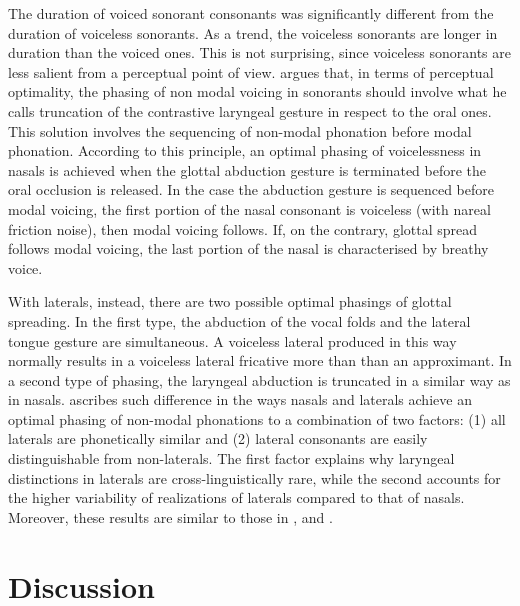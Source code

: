 \documentclass[11pt,a4paper,openany]{memoir}\usepackage[]{graphicx}\usepackage[]{color}
\begin{document}
The duration of voiced sonorant consonants was significantly different from the duration of voiceless sonorants.
As a trend, the voiceless sonorants are longer in duration than the voiced ones.
This is not surprising, since voiceless sonorants are less salient from a perceptual point of view.
\citet{silverman1997} argues that, in terms of perceptual optimality, the phasing of non modal voicing in sonorants should involve what he calls truncation of the contrastive laryngeal gesture in respect to the oral ones.
This solution involves the sequencing of non-modal phonation before modal phonation.
According to this principle, an optimal phasing of voicelessness in nasals is achieved when the glottal abduction gesture is terminated before the oral occlusion is released.
In the case the abduction gesture is sequenced before modal voicing, the first portion of the nasal consonant is voiceless (with nareal friction noise), then modal voicing follows.
If, on the contrary, glottal spread follows modal voicing, the last portion of the nasal is characterised by breathy voice.

With laterals, instead, there are two possible optimal phasings of glottal spreading.
In the first type, the abduction of the vocal folds and the lateral tongue gesture are simultaneous.
A voiceless lateral produced in this way normally results in a voiceless lateral fricative more than than an approximant.
In a second type of phasing, the laryngeal abduction is truncated in a similar way as in nasals.
\citet{silverman1997} ascribes such difference in the ways nasals and laterals achieve an optimal phasing of non-modal phonations to a combination of two factors: (1) all laterals are phonetically similar and (2) lateral consonants are easily distinguishable from non-laterals.
The first factor explains why laryngeal distinctions in laterals are cross-linguistically rare, while the second accounts for the higher variability of realizations of laterals compared to that of nasals.
Moreover, these results are similar to those in \citet{jessen1998}, \citet{bombien2006} and \citet{silverman2012}.










\chapter{Discussion}
\label{c:discussion}
\end{document}
